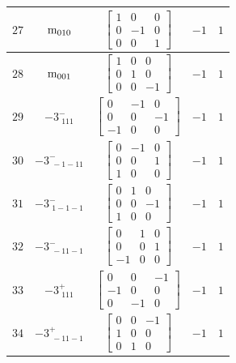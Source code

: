 \documentclass[fleqn,8pt]{jsarticle}
\begin{document}
\begin{longtable}{ccccc}
$ 27 $ & $ {\rm m}_{010} $ & $ \begin{bmatrix} 1 & 0 & 0 \\ 0 & -1 & 0 \\ 0 & 0 & 1 \end{bmatrix} $ & $ -1 $ & $ 1 $ \\ \hline
$ 28 $ & $ {\rm m}_{001} $ & $ \begin{bmatrix} 1 & 0 & 0 \\ 0 & 1 & 0 \\ 0 & 0 & -1 \end{bmatrix} $ & $ -1 $ & $ 1 $ \\ \hline
$ 29 $ & $ -3^{-}_{\,\,111} $ & $ \begin{bmatrix} 0 & -1 & 0 \\ 0 & 0 & -1 \\ -1 & 0 & 0 \end{bmatrix} $ & $ -1 $ & $ 1 $ \\ \hline
$ 30 $ & $ -3^{-}_{\,\,-1-11} $ & $ \begin{bmatrix} 0 & -1 & 0 \\ 0 & 0 & 1 \\ 1 & 0 & 0 \end{bmatrix} $ & $ -1 $ & $ 1 $ \\ \hline
$ 31 $ & $ -3^{-}_{\,\,1-1-1} $ & $ \begin{bmatrix} 0 & 1 & 0 \\ 0 & 0 & -1 \\ 1 & 0 & 0 \end{bmatrix} $ & $ -1 $ & $ 1 $ \\ \hline
$ 32 $ & $ -3^{-}_{\,\,-11-1} $ & $ \begin{bmatrix} 0 & 1 & 0 \\ 0 & 0 & 1 \\ -1 & 0 & 0 \end{bmatrix} $ & $ -1 $ & $ 1 $ \\ \hline
$ 33 $ & $ -3^{+}_{\,\,111} $ & $ \begin{bmatrix} 0 & 0 & -1 \\ -1 & 0 & 0 \\ 0 & -1 & 0 \end{bmatrix} $ & $ -1 $ & $ 1 $ \\ \hline
$ 34 $ & $ -3^{+}_{\,\,-11-1} $ & $ \begin{bmatrix} 0 & 0 & -1 \\ 1 & 0 & 0 \\ 0 & 1 & 0 \end{bmatrix} $ & $ -1 $ & $ 1 $ \\ \hline

\end{longtable}
\end{document}

